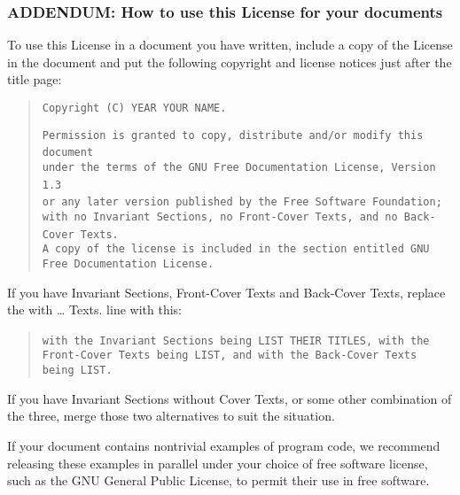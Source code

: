 \documentclass[10pt,english]{article}
\begin{document}
\subsubsection*{ADDENDUM: How to use this License for your documents}

To use this License in a document you have written, include a copy
of the License in the document and put the following copyright and
license notices just after the title page:
\begin{quote}
\texttt{Copyright (C) YEAR YOUR NAME.}

\texttt{Permission is granted to copy, distribute and/or modify this
document}~\\
\texttt{under the terms of the GNU Free Documentation License, Version
1.3}~\\
\texttt{or any later version published by the Free Software Foundation;}~\\
\texttt{with no Invariant Sections, no Front-Cover Texts, and no Back-Cover
Texts.}~\\
\texttt{A copy of the license is included in the section entitled
\textquotedbl{}GNU Free Documentation License\textquotedbl{}.}
\end{quote}
If you have Invariant Sections, Front-Cover Texts and Back-Cover Texts,
replace the \textquotedbl{}with \ldots{} Texts.\textquotedbl{} line
with this:
\begin{quote}
\texttt{with the Invariant Sections being LIST THEIR TITLES, with
the}~\\
\texttt{Front-Cover Texts being LIST, and with the Back-Cover Texts
being LIST.}
\end{quote}
If you have Invariant Sections without Cover Texts, or some other
combination of the three, merge those two alternatives to suit the
situation.

If your document contains nontrivial examples of program code, we
recommend releasing these examples in parallel under your choice of
free software license, such as the GNU General Public License, to
permit their use in free software.
\end{document}
